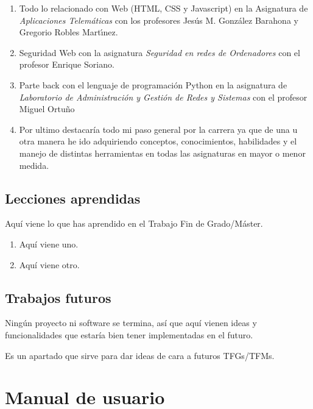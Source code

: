 \documentclass[a4paper, 12pt]{book}
\begin{document}
\begin{enumerate}
  \item Todo lo relacionado con Web (HTML, CSS y Javascript) en la Asignatura de \textit{Aplicaciones Telemáticas} con los profesores Jesús M. González Barahona y Gregorio Robles Martı́nez.
  \item Seguridad Web con la asignatura \textit{Seguridad en redes de Ordenadores} con el profesor Enrique Soriano.
  \item Parte back con el lenguaje de programación Python en la asignatura de \textit{Laboratorio de Administración y Gestión de Redes y Sistemas} con el profesor Miguel Ortuño
  \item Por ultimo destacaría todo mi paso general por la carrera ya que de una u otra manera he ido adquiriendo conceptos, conocimientos, habilidades y el manejo de distintas herramientas en todas las asignaturas en mayor o menor medida.
\end{enumerate}


\section{Lecciones aprendidas}
\label{sec:lecciones_aprendidas}

Aquí viene lo que has aprendido en el Trabajo Fin de Grado/Máster.

\begin{enumerate}
  \item Aquí viene uno.
  \item Aquí viene otro.
\end{enumerate}


\section{Trabajos futuros}
\label{sec:trabajos_futuros}

Ningún proyecto ni software se termina, así que aquí vienen ideas y funcionalidades que estaría bien tener implementadas en el futuro.

Es un apartado que sirve para dar ideas de cara a futuros TFGs/TFMs.



\cleardoublepage
\appendix
\chapter{Manual de usuario}
\label{app:manual}
\end{document}
